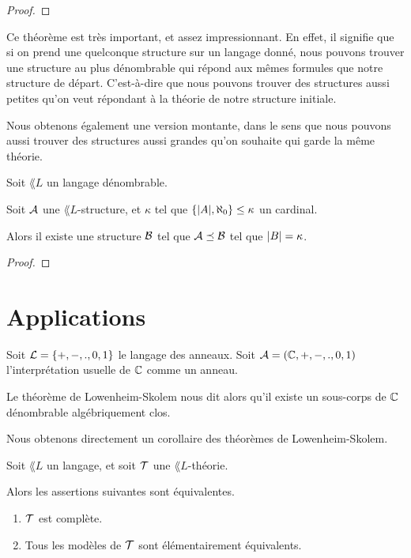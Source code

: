 \documentclass[a4paper, 12pt]{report}
\begin{document}
\ifdefined\outputproof
\begin{proof}

\end{proof}
\fi

Ce théorème est très important, et assez impressionnant. En effet, il signifie
que si on prend une quelconque structure sur un langage donné, nous pouvons
trouver une structure au plus dénombrable qui répond aux mêmes formules que
notre structure de départ. C'est-à-dire que nous pouvons trouver des structures
aussi petites qu'on veut répondant à la théorie de notre structure initiale.

Nous obtenons également une version montante, dans le sens que nous pouvons
aussi trouver des structures aussi grandes qu'on souhaite qui garde la même théorie.

\begin{theorem} 
	Soit $\lang{L}$ un langage dénombrable.

	Soit $\mathcal{A}$ une $\lang{L}$-structure, et $\kappa$ tel que
	$\left\{ |A|, \aleph_{0} \right\} \leq \kappa$ un cardinal.

	Alors il existe une structure $\mathcal{B}$ tel que $\mathcal{A}
	\preceq \mathcal{B}$ tel que $|B| = \kappa$.
	\label{theorem:lowenheim_skolem_montant}
\end{theorem}

\ifdefined\outputproof
\begin{proof}

\end{proof}
\fi

\section{Applications}

\begin{exemple}
	Soit $\mathcal{L} = \left\{ +, -, ., 0, 1 \right\}$ le langage des anneaux.
	Soit $\mathcal{A} = (\mathbb{C}, +, -, ., 0, 1)$ l'interprétation usuelle de
	$\mathbb{C}$ comme un anneau.

	Le théorème de Lowenheim-Skolem nous dit alors qu'il existe un sous-corps de
	$\mathbb{C}$ dénombrable algébriquement clos.
\end{exemple}

Nous obtenons directement un corollaire des théorèmes de Lowenheim-Skolem.

\begin{corollary}
	\label{lemma:complete_equiv_elementaire_equivalentes}
	Soit $\lang{L}$ un langage, et soit $\mathcal{T}$ une $\lang{L}$-théorie.

	Alors les assertions suivantes sont équivalentes.

	\begin{enumerate}
		\item \label{statement:complete} $\mathcal{T}$ est complète.
		\item \label{statement:all_model_elem_equiv} Tous les modèles de $\mathcal{T}$ sont élémentairement équivalents.
	\end{enumerate}
\end{corollary}
\end{document}
